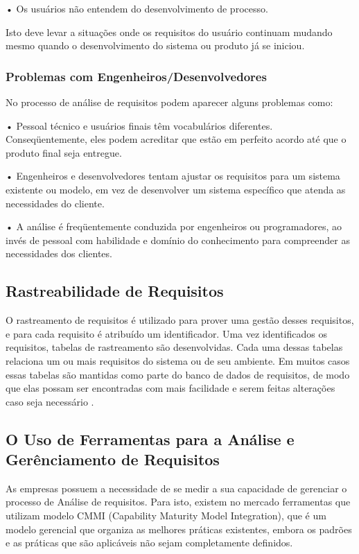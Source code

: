 • Os usuários não entendem do desenvolvimento de processo.

Isto deve levar a situações onde os requisitos do usuário continuam mudando
mesmo quando o desenvolvimento do sistema ou produto já se iniciou.

\subsubsection{Problemas com Engenheiros/Desenvolvedores}
\label{subsec:problemasEngenheiros}

No processo de análise de requisitos podem aparecer alguns problemas
como:

• Pessoal técnico e usuários finais têm vocabulários diferentes.
Conseqüentemente, eles podem acreditar que estão em perfeito acordo
até que o produto final seja entregue.

• Engenheiros e desenvolvedores tentam ajustar os requisitos para um
sistema existente ou modelo, em vez de desenvolver um sistema
específico que atenda as necessidades do cliente.

• A análise é freqüentemente conduzida por engenheiros ou programadores,
ao invés de pessoal com habilidade e domínio do conhecimento para
compreender as necessidades dos clientes.

\subsection{Rastreabilidade de Requisitos}
\label{subsec:rastreabilidade}

O rastreamento de requisitos é utilizado para prover uma gestão desses requisitos, 
e para cada requisito é atribuído um identificador. Uma vez identificados os requisitos, 
tabelas de rastreamento são desenvolvidas. Cada uma dessas tabelas relaciona um ou mais 
requisitos do sistema ou de seu ambiente. 
Em muitos casos essas tabelas são mantidas como parte do banco de dados de requisitos,
de modo que elas possam ser encontradas com mais facilidade e serem feitas alterações 
caso seja necessário \cite{Pressman:2010}.

\subsection{O Uso de Ferramentas para a Análise e Gerênciamento de Requisitos}
\label{subsec:ferramentasAnalise}

As empresas possuem a necessidade de se medir a sua capacidade de
gerenciar o processo de Análise de requisitos. Para isto, existem no mercado
ferramentas que utilizam modelo CMMI (Capability Maturity Model Integration), que é
um modelo gerencial que organiza as melhores práticas existentes, embora os
padrões e as práticas que são aplicáveis não sejam completamente definidos.

